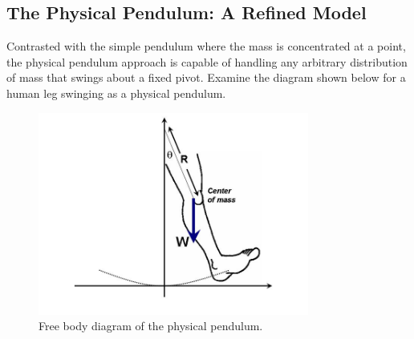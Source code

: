 \subsection{The Physical Pendulum: A Refined Model}

Contrasted with the simple pendulum where the mass is concentrated at a point, the physical pendulum approach is capable of handling any arbitrary distribution of mass that swings about a fixed pivot.  Examine the diagram shown below for a human leg swinging as a physical pendulum.
\begin{figure}[htb]
	\centering
	\includegraphics[width=3.5in]{./figures/Topic1/Figure1-6.jpg}
	\caption{Free body diagram of the physical pendulum.}
	\label{Fig1-6}
\end{figure}
  

